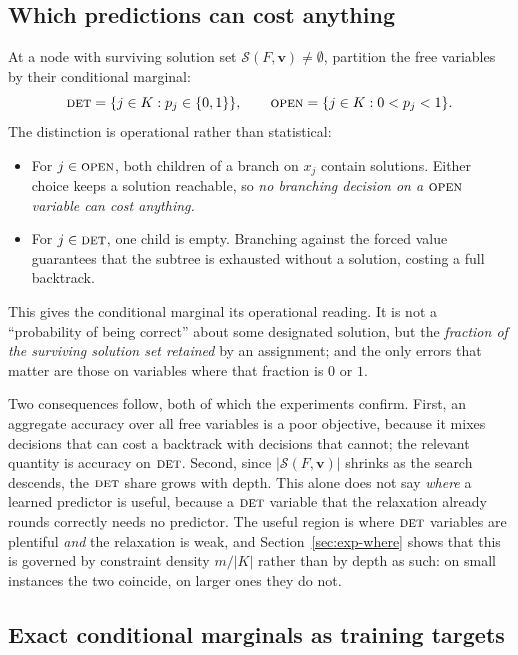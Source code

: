 \documentclass[final,5p,times,twocolumn]{elsarticle}
\newcommand{\SOL}{\mathcal{S}}
\newcommand{\FORCED}{\textsc{det}}
\newcommand{\FREE}{\textsc{open}}
\begin{document}
\subsection{Which predictions can cost anything}
\label{sec:method-partition}

At a node with surviving solution set $\SOL(F,\mathbf{v})\ne\emptyset$, partition the free variables by their conditional marginal:
\begin{equation}
\FORCED = \{j\in K : p_j\in\{0,1\}\},
\qquad
\FREE = \{j\in K : 0<p_j<1\}.
\end{equation}
The distinction is operational rather than statistical:

\begin{itemize}
\item For $j\in\FREE$, both children of a branch on $x_j$ contain solutions. Either choice keeps a solution reachable, so \emph{no branching decision on a $\FREE$ variable can cost anything.}
\item For $j\in\FORCED$, one child is empty. Branching against the forced value guarantees that the subtree is exhausted without a solution, costing a full backtrack.
\end{itemize}

This gives the conditional marginal its operational reading. It is not a ``probability of being correct'' about some designated solution, but the \emph{fraction of the surviving solution set retained} by an assignment; and the only errors that matter are those on variables where that fraction is $0$ or $1$.

Two consequences follow, both of which the experiments confirm. First, an aggregate accuracy over all free variables is a poor objective, because it mixes decisions that can cost a backtrack with decisions that cannot; the relevant quantity is accuracy on $\FORCED$. Second, since $|\SOL(F,\mathbf{v})|$ shrinks as the search descends, the $\FORCED$ share grows with depth. This alone does not say \emph{where} a learned predictor is useful, because a $\FORCED$ variable that the relaxation already rounds correctly needs no predictor. The useful region is where $\FORCED$ variables are plentiful \emph{and} the relaxation is weak, and Section~\ref{sec:exp-where} shows that this is governed by constraint density $m/|K|$ rather than by depth as such: on small instances the two coincide, on larger ones they do not.

\subsection{Exact conditional marginals as training targets}
\label{sec:method-targets}
\label{sec:method-labels}
\end{document}
